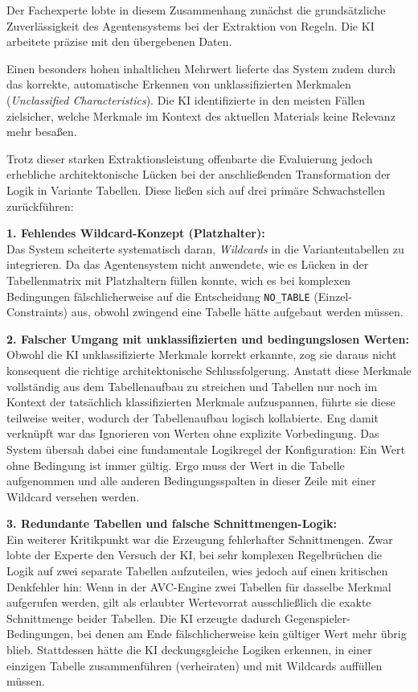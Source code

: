 Der Fachexperte lobte in diesem Zusammenhang zunächst die grundsätzliche Zuverlässigkeit des Agentensystems bei der Extraktion von Regeln. Die \ac{KI} arbeitete präzise mit den übergebenen Daten.

Einen besonders hohen inhaltlichen Mehrwert lieferte das System zudem durch das korrekte, automatische Erkennen von unklassifizierten Merkmalen (\textit{Unclassified Characteristics}). Die \ac{KI} identifizierte in den meisten Fällen zielsicher, welche Merkmale im Kontext des aktuellen Materials keine Relevanz mehr besaßen.

Trotz dieser starken Extraktionsleistung offenbarte die Evaluierung jedoch erhebliche architektonische Lücken bei der anschließenden Transformation der Logik in Variante Tabellen. Diese ließen sich auf drei primäre Schwachstellen zurückführen:

\textbf{1. Fehlendes Wildcard-Konzept (Platzhalter):} \\
Das System scheiterte systematisch daran, \textit{Wildcards} in die Variantentabellen zu integrieren. Da das Agentensystem nicht anwendete, wie es Lücken in der Tabellenmatrix mit Platzhaltern füllen konnte, wich es bei komplexen Bedingungen fälschlicherweise auf die Entscheidung \texttt{NO\_TABLE} (Einzel-Constraints) aus, obwohl zwingend eine Tabelle hätte aufgebaut werden müssen.

\textbf{2. Falscher Umgang mit unklassifizierten und bedingungslosen Werten:} \\
Obwohl die \ac{KI} unklassifizierte Merkmale korrekt erkannte, zog sie daraus nicht konsequent die richtige architektonische Schlussfolgerung. Anstatt diese Merkmale vollständig aus dem Tabellenaufbau zu streichen und Tabellen nur noch im Kontext der tatsächlich klassifizierten Merkmale aufzuspannen, führte sie diese teilweise weiter, wodurch der Tabellenaufbau logisch kollabierte. Eng damit verknüpft war das Ignorieren von Werten ohne explizite Vorbedingung. Das System übersah dabei eine fundamentale Logikregel der Konfiguration: Ein Wert ohne Bedingung ist immer gültig. Ergo muss der Wert in die Tabelle aufgenommen und alle anderen Bedingungsspalten in dieser Zeile mit einer Wildcard versehen werden.

\textbf{3. Redundante Tabellen und falsche Schnittmengen-Logik:} \\
Ein weiterer Kritikpunkt war die Erzeugung fehlerhafter Schnittmengen. Zwar lobte der Experte den Versuch der \ac{KI}, bei sehr komplexen Regelbrüchen die Logik auf zwei separate Tabellen aufzuteilen, wies jedoch auf einen kritischen Denkfehler hin: Wenn in der \ac{AVC}-Engine zwei Tabellen für dasselbe Merkmal aufgerufen werden, gilt als erlaubter Wertevorrat ausschließlich die exakte Schnittmenge beider Tabellen. Die \ac{KI} erzeugte dadurch \glqq Gegenspieler-Bedingungen\grqq{}, bei denen am Ende fälschlicherweise kein gültiger Wert mehr übrig blieb. Stattdessen hätte die \ac{KI} deckungsgleiche Logiken erkennen, in einer einzigen Tabelle zusammenführen (\glqq verheiraten\grqq{}) und mit Wildcards auffüllen müssen.

